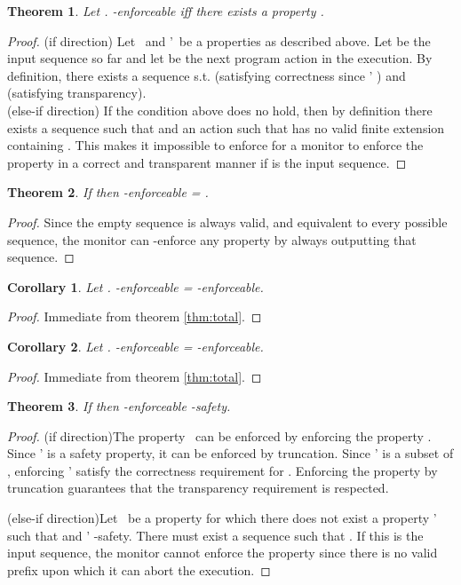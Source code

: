 \documentclass[12pt]{article}
\newtheorem{thm}{Theorem}
\newtheorem{cor}{Corollary}
\begin{document}
\begin{thm}
Let  .   -enforceable iff there exists a property .
\end{thm}
\begin{proof}
(if direction) Let \Property\ and \Property'\ be a properties as described above. Let  be the input sequence so far and let  be the next program action in the execution.  By definition, there exists a sequence  s.t.   (satisfying correctness since \Property'  \Property) and  (satisfying transparency).\\
(else-if direction) If the condition above does no hold, then by definition there exists a sequence  such that  and an action  such that  has no valid finite extension containing .  This makes it impossible to enforce for a monitor to enforce the property in a correct and transparent manner if  is the input sequence.
\end{proof}

\begin{thm}
If  then -enforceable = .
\end{thm}
\begin{proof}
Since the empty sequence  is always valid, and equivalent to every possible sequence, the monitor can -enforce any property by always outputting that sequence.
\end{proof}

\begin{cor}
Let  . -enforceable = -enforceable.
\end{cor}
\begin{proof}
Immediate from theorem \ref{thm:total}.
\end{proof}


\begin{cor}
Let  . -enforceable =
-en\-for\-ceable.
\end{cor}
\begin{proof}
Immediate from theorem \ref{thm:total}.
\end{proof}




\setcounter{thm}{9}
\begin{thm}
If  then -enforceable -safety.
\end{thm}
\begin{proof}
(if direction)The property \Property\ can be enforced by enforcing the property . Since \Property' is a safety property, it can be enforced by truncation. Since \Property' is a subset of \Property, enforcing \Property' satisfy the correctness requirement for \Property. Enforcing the property by truncation guarantees that the transparency requirement is respected.

(else-if direction)Let \Property\ be a property for which there does not exist a property \Property' such that    and \Property'  -safety. There must exist a sequence  such that  . If  this is the input sequence, the monitor cannot enforce the property since there is no valid prefix upon which it can abort the execution.
\end{proof}
\end{document}
